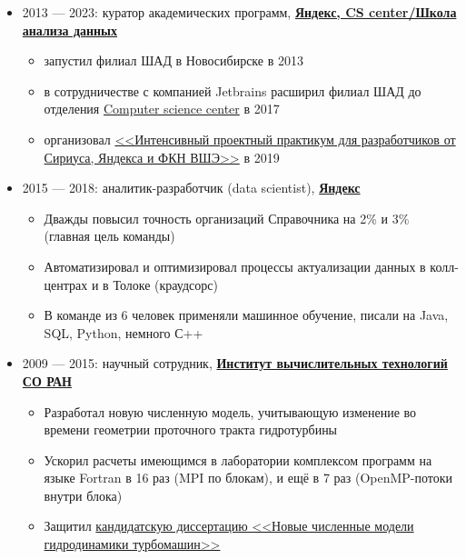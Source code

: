 \documentclass[11pt]{article}
\begin{document}
\begin{itemize}
	\item 2013 — 2023: куратор академических программ, \textbf{\href{https://compscicenter.ru}{Яндекс, CS center/Школа анализа данных}}
	\begin{itemize}
		\item запустил филиал ШАД в Новосибирске в 2013
		\item в сотрудничестве с компанией Jetbrains расширил филиал ШАД до отделения \href{https://compscicenter.ru}{Computer science center} в 2017
		\item организовал \href{https://sochisirius.ru/obuchenie/graduates/smena240/1174}{<<Интенсивный проектный практикум для разработчиков от Сириуса, Яндекса и ФКН ВШЭ>>} в 2019
	\end{itemize}

	\item 2015 — 2018: аналитик-разработчик (data scientist), \textbf{\href{https://yandex.ru/}{Яндекс}}
	\begin{itemize}
		\item Дважды повысил точность организаций Справочника на 2\% и 3\% (главная цель команды)
		\item Автоматизировал и оптимизировал процессы актуализации данных в колл-центрах и в Толоке (краудсорс)
		\item В команде из 6 человек применяли машинное обучение, писали на Java, SQL, Python, немного С++
	\end{itemize}

	\item 2009 — 2015: научный сотрудник, \textbf{\href{http://www.ict.nsc.ru}{Институт вычислительных технологий СО РАН}}
	\begin{itemize}
		\item Разработал новую численную модель, учитывающую изменение во времени геометрии проточного тракта гидротурбины
		\item Ускорил расчеты имеющимся в лаборатории комплексом программ на языке Fortran в 16 раз (MPI по блокам), и ещё в 7 раз (OpenMP-потоки внутри блока)
		\item Защитил \href{https://github.com/avalur/dissertation/blob/master/to_print/autoref_Avdyushenko.pdf}{кандидатскую диссертацию <<Новые численные модели гидродинамики турбомашин>>}
	\end{itemize}
\end{itemize}
\end{document}
